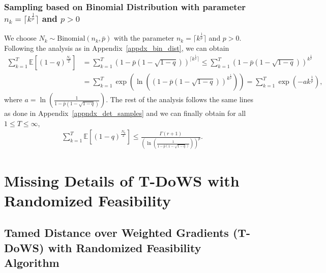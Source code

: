 \documentclass{article}
\newcommand{\EXP}[1]
{\mathbb{E}\!\left[#1\right] }
\theoremstyle{plain}
\theoremstyle{definition}
\theoremstyle{remark}
\begin{document}
\subsubsection{Sampling based on Binomial Distribution with parameter $n_k = \lceil k^{\frac{1}{p}} \rceil$ and $p > 0$}

We choose $N_k \sim \text{Binomial}(n_k, \bar p)$ with the parameter $n_k = \lceil k^{\frac{1}{p}} \rceil$ and $p > 0$. Following the analysis as in Appendix~\ref{appdx_bin_dist}, we can obtain
\begin{align*}
    \sum_{k=1}^T \EXP{(1-q)^{\frac{N_{k}}{2}}} &= \sum_{k=1}^T \left( 1 - \bar p \left( 1 - \sqrt{1 - q} \right) \right)^{\lceil k^{\frac{1}{p}} \rceil} \leq \sum_{k=1}^T \left( 1 - \bar p \left( 1 - \sqrt{1 - q} \right) \right)^{k^{\frac{1}{p}}} \\
    &= \sum_{k=1}^T \exp \left( \ln\left(\left( 1 - \bar p \left( 1 - \sqrt{1 - q} \right) \right)^{k^{\frac{1}{p}}} \right)\right) = \sum_{k=1}^T \exp \left( -a {k^{\frac{1}{p}}} \right) ,
\end{align*}
where $a = \ln \left( \frac{1}{1 - \bar p \left( 1 - \sqrt{1 - q} \right)} \right)$. The rest of the analysis follows the same lines as done in Appendix~\ref{appndx_det_samples} and we can finally obtain for all $1 \leq T \leq \infty$,
\begin{align*}
    \sum_{k=1}^T \EXP{(1-q)^{\frac{N_{k}}{2}}} \leq \frac{\Gamma(r+1)}{\left( \ln \left( \frac{1}{1 - \bar p \left( 1 - \sqrt{1 - q} \right)} \right) \right)^p} .
\end{align*}



\section{Missing Details of T-DoWS with Randomized Feasibility}

\subsection{Tamed Distance over Weighted Gradients (T-DoWS) with Randomized Feasibility Algorithm}\label{app_algo_tdows}
\end{document}
